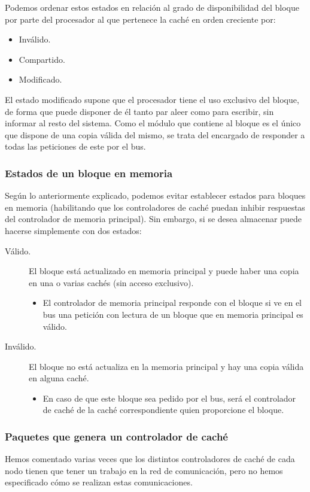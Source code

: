 Podemos ordenar estos estados en relación al grado de disponibilidad del bloque por parte del procesador al que pertenece la caché en orden creciente por:
\begin{itemize}
    \item Inválido.
    \item Compartido.
    \item Modificado.
\end{itemize}
El estado modificado supone que el procesador tiene el uso exclusivo del bloque, de forma que puede disponer de él tanto par aleer como para escribir, sin informar al resto del sistema. Como el módulo que contiene al bloque es el único que dispone de una copia válida del mismo, se trata del encargado de responder a todas las peticiones de este por el bus. 

\subsubsection{Estados de un bloque en memoria}
Según lo anteriormente explicado, podemos evitar establecer estados para bloques en memoria (habilitando que los controladores de caché puedan inhibir respuestas del controlador de memoria principal). Sin embargo, si se desea almacenar puede hacerse simplemente con dos estados:
\begin{description}
    \item [Válido.] El bloque está actualizado en memoria principal y puede haber una copia en una o varias cachés (sin acceso exclusivo). 

        \begin{itemize}
            \item El controlador de memoria principal responde con el bloque si ve en el bus una petición con lectura de un bloque que en memoria principal es válido.
        \end{itemize}
    \item [Inválido.] El bloque no está actualiza en la memoria principal y hay una copia válida en alguna caché.

        \begin{itemize}
            \item En caso de que este bloque sea pedido por el bus, será el controlador de caché de la caché correspondiente quien proporcione el bloque.
        \end{itemize}
\end{description}

\subsubsection{Paquetes que genera un controlador de caché}
Hemos comentado varias veces que los distintos controladores de caché de cada nodo tienen que tener un trabajo en la red de comunicación, pero no hemos especificado cómo se realizan estas comunicaciones. 

